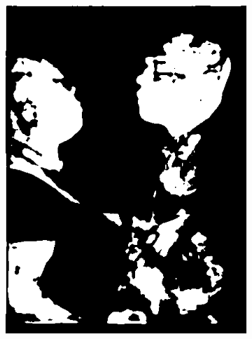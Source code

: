 \begin{figure}[h]
{\begin{subfigure}[b]{0.23\textwidth}
         \includegraphics[width=\textwidth]{images/results/cross_st/mike_med_dark_skinny_19.png}
     \end{subfigure}
    \hfill
     \begin{subfigure}[b]{0.23\textwidth}
         \centering

\end{subfigure}}
\end{figure}
